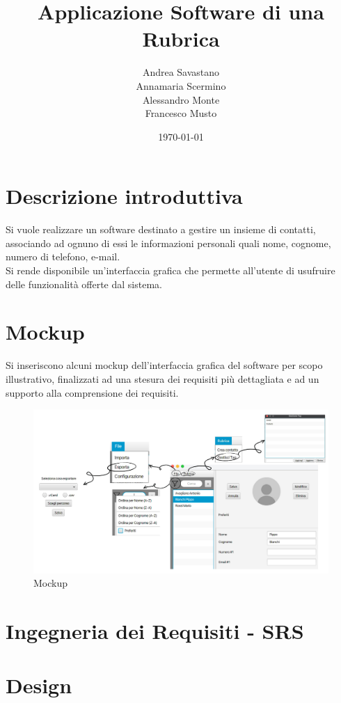 \documentclass[12pt, a4paper]{article}
\title{\Huge Applicazione Software di una Rubrica}
\author{Andrea Savastano 
	\\ Annamaria Scermino
	\\ Alessandro Monte 
	\\ Francesco Musto}
\date{\today}
\newcommand{\disablelinkcolor}{%
	\hypersetup{linkcolor=black}%
}
\newcommand{\enablelinkcolor}{
	\hypersetup{
	    linkcolor=blue
	}
}
\begin{document}
	\fancyhf{}
	\thispagestyle{fancy}
	
	\maketitle
	\newpage
\disablelinkcolor
	\tableofcontents 
	\listoffigures
	
\enablelinkcolor %
	
	\newpage
	\section*{Descrizione introduttiva}
	Si vuole realizzare un software destinato a gestire un insieme di contatti, associando ad ognuno di essi le informazioni personali quali nome, cognome, numero di telefono, e-mail.
	\vspace{.2cm}\\Si rende disponibile un'interfaccia grafica che permette all'utente di usufruire delle funzionalità offerte dal sistema.
	
	\section*{Mockup}
	Si inseriscono alcuni mockup dell'interfaccia grafica del software per scopo illustrativo, finalizzati ad una stesura dei requisiti più dettagliata e ad un supporto alla comprensione dei requisiti.
\begin{figure}[h]
	\centering
	\includegraphics[width=\linewidth]{images/mockup.png}
	\caption{Mockup}
	\label{mockup}			
\end{figure}
	
	
	\newpage
	\fancyhf{} %
	\fancyhead[L]{\nouppercase{\leftmark}} %
	
	\section{Ingegneria dei Requisiti - SRS}
	
	
	\newpage
	\section{Design}
	
	
\end{document}
